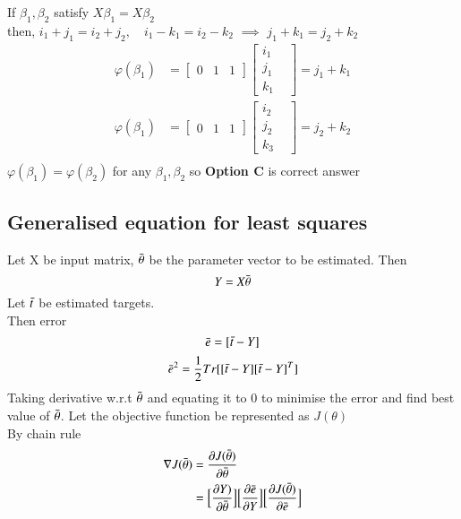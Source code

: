 \documentclass{article}
\begin{document}
\begin{enumerate}
If $\beta_1,\beta_2$ satisfy $X\beta_1 =X\beta_2 $\\
then, $i_1+j_1 = i_2+j_2, \quad i_1-k_1 = i_2-k_2$ $\implies$ $j_1 + k_1= j_2 + k_2$
\begin{align*}
\varphi(\beta_1) &= \begin{bmatrix} 0& 1& 1 \end{bmatrix} \begin{bmatrix} i_1&\\ j_1&\\ k_1& \end{bmatrix} = j_1 + k_1\\ 
\varphi(\beta_1) &= \begin{bmatrix} 0& 1& 1 \end{bmatrix} \begin{bmatrix} i_2&\\ j_2&\\ k_3& \end{bmatrix} = j_2 + k_2\\ 
\end{align*}
 $\varphi(\beta_1)  = \varphi(\beta_2)$ for any $\beta_1, \beta_2$ so \textbf{Option C} is correct answer
\end{enumerate}
\subsection{Generalised equation for least squares}
Let  {X} be input matrix,  {$\Bar{\theta}$} be the parameter vector to be estimated. Then 
\begin{equation}
     {Y} =  {X} \Bar{\theta}
\end{equation}
Let $\Bar{t}$ be estimated targets.\\
Then error 
\begin{equation*}
  \Bar{e} = [\Bar{t} -  {Y}]
\end{equation*}
\begin{equation*}
  \Bar{e}^2 = \frac{1}{2} Tr[[\Bar{t} -  {Y}][\Bar{t} -  {Y}]^T]
\end{equation*}
Taking derivative w.r.t $\Bar{\theta}$ and equating it to 0 to minimise the error and find best value of $\Bar{\theta}$. Let the objective function be represented as $J(\theta)$\\
By chain rule
\begin{align*}
    \nabla J(\Bar{\theta}) &= \frac{\partial J(\Bar{\theta})}{\partial \Bar{\theta}} \\
    &= \Big [\frac{\partial  {Y})}{\partial \Bar{\theta} }\Big] \Big [\frac{\partial \Bar{e}}{\partial  {Y} }\Big] \Big[\frac{\partial J(\Bar{\theta})}{\partial \Bar{e}}\Big]
\end{align*}
\end{document}

